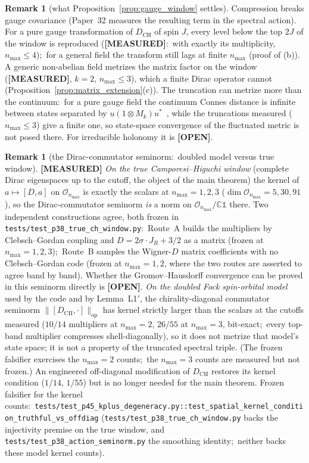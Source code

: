 \documentclass[11pt,a4paper]{article}
\theoremstyle{plain}
\theoremstyle{definition}
\newtheorem{remark}[theorem]{Remark}
\newcommand{\nmax}{n_{\max}}
\newcommand{\Op}{\mathcal{O}}
\newcommand{\opnorm}[1]{\lVert #1 \rVert_{\mathrm{op}}}
\newcommand{\DCH}{D_{\mathrm{CH}}}
\begin{document}
\begin{remark}[what Proposition~\ref{prop:gauge_window} settles]
\label{rem:gauge_window_scope}
Compression breaks gauge covariance (Paper~32 measures the resulting
term in the spectral action). For a pure gauge transformation of
$\DCH$ of spin $J$, every level below the top $2J$ of the window is
reproduced (\textbf{[MEASURED]}:\ with exactly its multiplicity,
$\nmax \le 4$);\ for a general field the transform still lags at
finite $\nmax$ (proof of (b)). A generic non-abelian field metrizes the
matrix factor on the window (\textbf{[MEASURED]}, $k = 2$, $\nmax \le
3$), which a finite Dirac operator cannot
(Proposition~\ref{prop:matrix_extension}(c)). The truncation can
metrize more than the continuum:\ for a pure gauge field the continuum
Connes distance is infinite between states separated by $u (1 \otimes
M_k) u^*$~\cite{martinetti2006}, while the truncations measured ($\nmax
\le 3$) give a finite one, so state-space convergence of the fluctuated
metric is not posed there. For irreducible holonomy it is
\textbf{[OPEN]}.
\end{remark}



\begin{remark}[the Dirac-commutator seminorm:\ doubled model versus true window]
\label{rem:dirac_degeneracy}
\textbf{[MEASURED]} \emph{On the true Camporesi--Higuchi window}
(complete Dirac eigenspaces up to the cutoff, the object of the main
theorem) the kernel of $a \mapsto [D, a]$ on $\Op_{\nmax}$ is exactly
the scalars at $\nmax = 1, 2, 3$ ($\dim \Op_{\nmax} = 5, 30, 91$), so
the Dirac-commutator seminorm \emph{is} a norm on $\Op_{\nmax}/\mathbb{C}\mathbb{1}$
there. Two independent constructions agree, both frozen in
\texttt{tests/test\_p38\_true\_ch\_window.py}:\ Route~A builds the
multipliers by Clebsch--Gordan coupling and $D = 2\sigma\cdot J_R + 3/2$
as a matrix (frozen at $\nmax = 1, 2, 3$);\ Route~B samples the
Wigner-$D$ matrix coefficients with no Clebsch--Gordan code (frozen at
$\nmax = 1, 2$, where the two routes are asserted to agree band by
band). Whether the
Gromov--Hausdorff convergence can be proved in this seminorm directly
is \textbf{[OPEN]}.
\emph{On the doubled Fock spin-orbital model} used by the code and by
Lemma~L1$'$, the chirality-diagonal commutator seminorm
$\opnorm{[\DCH, \cdot]}$ has kernel strictly larger
than the scalars at the cutoffs measured ($10/14$ multipliers at
$\nmax = 2$, $26/55$ at $\nmax = 3$, bit-exact;\ every top-band
multiplier compresses shell-diagonally), so it does not metrize that
model's state space; it is not a property of the truncated spectral
triple.  (The frozen falsifier exercises the
$\nmax = 2$ counts;\ the $\nmax = 3$ counts are measured but not
frozen.) An engineered off-diagonal modification of
$\DCH$ restores its kernel condition ($1/14$, $1/55$) but is no
longer needed for the main theorem. Frozen falsifier for the kernel
counts:\
\texttt{tests/test\_p45\_kplus\_degeneracy.py::test\_spatial\_kernel\_condition\_truthful\_vs\_offdiag}
(\texttt{tests/test\_p38\_true\_ch\_window.py} backs the injectivity
premise on the true window, and \texttt{tests/test\_p38\_action\_seminorm.py}
the smoothing identity;\ neither backs these model kernel counts).
\end{remark}
\end{document}

